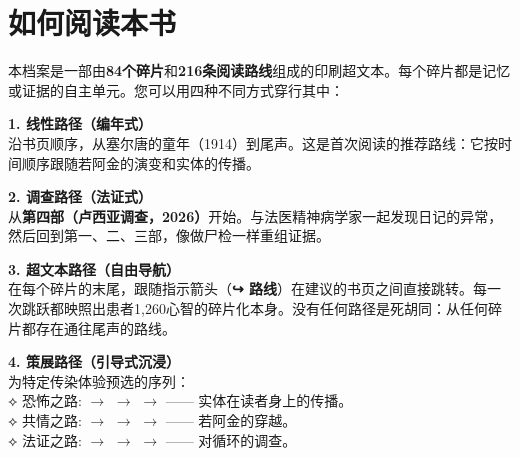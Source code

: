 \cleardoublepage
\thispagestyle{empty}
\chapter*{如何阅读本书}

\begingroup

本档案是一部由\textbf{84个碎片}和\textbf{216条阅读路线}组成的印刷超文本。每个碎片都是记忆或证据的自主单元。您可以用四种不同方式穿行其中：

\vspace{0.8em}

\noindent\textbf{1. 线性路径（编年式）}\\
\noindent 沿书页顺序，从塞尔唐的童年（1914）到尾声。这是首次阅读的推荐路线：它按时间顺序跟随若阿金的演变和实体的传播。

\vspace{0.5em}

\noindent\textbf{2. 调查路径（法证式）}\\
\noindent 从\textbf{第四部（卢西亚调查，2026）}开始。与法医精神病学家一起发现日记的异常，然后回到第一、二、三部，像做尸检一样重组证据。

\vspace{0.5em}

\noindent\textbf{3. 超文本路径（自由导航）}\\
\noindent 在每个碎片的末尾，跟随指示箭头（\textbf{↪ 路线}）在建议的书页之间直接跳转。每一次跳跃都映照出患者1,260心智的碎片化本身。没有任何路径是死胡同：从任何碎片都存在通往尾声的路线。

\vspace{0.5em}

\noindent\textbf{4. 策展路径（引导式沉浸）}\\
\noindent 为特定传染体验预选的序列：\\[0.3em]
\noindent\textcolor{sangue}{⟡ 恐怖之路:}  $\rightarrow$  $\rightarrow$  $\rightarrow$  —— 实体在读者身上的传播。\\[0.2em]
\noindent\textcolor{sangue}{⟡ 共情之路:}  $\rightarrow$  $\rightarrow$  $\rightarrow$  —— 若阿金的穿越。\\[0.2em]
\noindent\textcolor{sangue}{⟡ 法证之路:}  $\rightarrow$  $\rightarrow$  $\rightarrow$  —— 对循环的调查。

